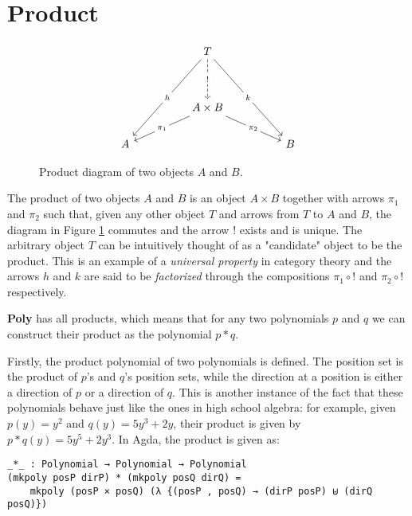 \section{Product}
\begin{figure}
  \[\begin{tikzcd}
    && T \\
    \\
    && {A \times B} \\
    A &&&& B
    \arrow["{\pi_1}"{description}, from=3-3, to=4-1]
    \arrow["{\pi_2}"{description}, from=3-3, to=4-5]
    \arrow["{!}"{description}, dashed, from=1-3, to=3-3]
    \arrow["h"{description}, from=1-3, to=4-1]
    \arrow["k"{description}, from=1-3, to=4-5]
  \end{tikzcd}\]
  \caption{Product diagram of two objects $A$ and $B$.}
  \label{fig:productDiagram}
\end{figure}

The product of two objects $A$ and $B$ is an object $A \times B$ together with arrows $\pi_1$ and $\pi_2$ such that, given any other object $T$ and arrows from $T$ to $A$ and $B$, the diagram in Figure \ref{fig:productDiagram} commutes and the arrow $!$ exists and is unique. The arbitrary object $T$ can be intuitively thought of as a "candidate" object to be the product. This is an example of a \textit{universal property} in category theory and the arrows $h$ and $k$ are said to be \textit{factorized} through the compositions $\pi_1 \circ  !$ and $\pi_2 \circ !$ respectively.

\textbf{Poly} has all products, which means that for any two polynomials $p$ and $q$ we can construct their product as the polynomial $p*q$.

Firstly, the product polynomial of two polynomials is defined. The position set is the product of $p$'s and $q$'s position sets, while the direction at a position is either a direction of $p$ or a direction of $q$. This is another instance of the fact that these polynomials behave just like the ones in high school algebra: for example, given $p(y) = y^2$ and $q(y) = 5y^3 + 2y$, their product is given by $p * q (y) = 5y^5 + 2y^3$. In Agda, the product is given as:

\begin{verbatim}
_*_ : Polynomial → Polynomial → Polynomial
(mkpoly posP dirP) * (mkpoly posQ dirQ) =
    mkpoly (posP × posQ) (λ {(posP , posQ) → (dirP posP) ⊎ (dirQ posQ)})
\end{verbatim}

